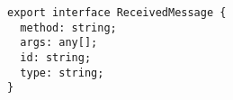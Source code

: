 \begin{verbatim}
export interface ReceivedMessage {
  method: string;
  args: any[];
  id: string;
  type: string;
}
\end{verbatim}
